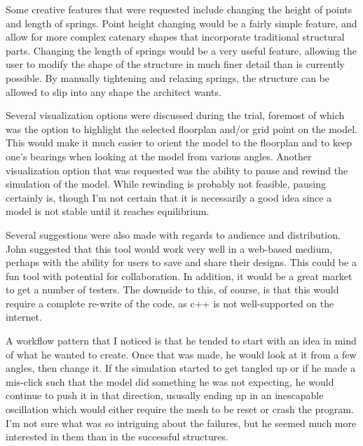 \documentclass{thesis}
\begin{document}
Some creative features that were requested include changing the height of points and length of springs.  Point height changing
would be a fairly simple feature, and allow for more complex catenary shapes that incorporate traditional structural parts.
Changing the length of springs would be a very useful feature, allowing the user to modify the shape of the structure in much
finer detail than is currently possible.  By manually tightening and relaxing springs, the structure can be allowed to slip into
any shape the architect wants.

Several visualization options were discussed during the trial, foremost of which was the option to highlight the selected floorplan
and/or grid point on the model.  This would make it much easier to orient the model to the floorplan and to keep one's bearings
when looking at the model from various angles.  Another visualization option that was requested was the ability to pause and rewind
the simulation of the model.  While rewinding is probably not feasible, pausing certainly is, though I'm not certain that it is
necessarily a good idea since a model is not stable until it reaches equilibrium.

Several suggestions were also made with regards to audience and distribution.  John suggested that this tool would work very well in
a web-based medium, perhaps with the ability for users to save and share their designs.  This could be a fun tool with potential for
collaboration.  In addition, it would be a great market to get a number of testers.  The downside to this, of course, is that this
would require a complete re-write of the code, as c++ is not well-supported on the internet.

A workflow pattern that I noticed is that he tended to start with an idea in mind of what he wanted to create.  Once that was made,
he would look at it from a few angles, then change it.  If the simulation started to get tangled up or if he made a mis-click
such that the model did something he was not expecting, he would continue to push it in that direction, ususally ending up in an
inescapable oscillation which would either require the mesh to be reset or crash the program.  I'm not sure what was so intriguing
about the failures, but he seemed much more interested in them than in the successful structures.



\begin{singlespace}


\end{singlespace}
\end{document}
